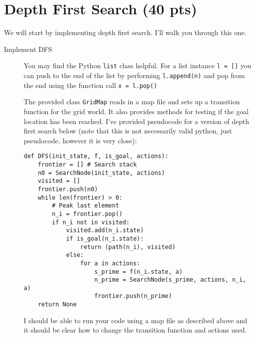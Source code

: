 \documentclass[11pt]{hermans-hw}
\begin{document}
\section{Depth First Search (40 pts)}
We will start by implementing depth first search. I'll walk you through this one.
\begin{description}
\item[Implement DFS] You may find the Python \texttt{list} class helpful. For a list instance \texttt{l = []} you can push to the end of the list by performing \texttt{l.append(n)} and pop from the end using the function call \texttt{x = l.pop()}

The provided class \texttt{GridMap} reads in a map file and sets up a transition function for the grid world. It also provides methods for testing if the goal location has been reached. I've provided pseudocode for a version of depth first search below (note that this is not necessarily valid python, just pseudocode, however it is very close):

\begin{verbatim}
def DFS(init_state, f, is_goal, actions):
    frontier = [] # Search stack
    n0 = SearchNode(init_state, actions)
    visited = []
    frontier.push(n0)
    while len(frontier) > 0:
        # Peak last element
        n_i = frontier.pop()
        if n_i not in visited:
            visited.add(n_i.state)
            if is_goal(n_i.state):
                return (path(n_i), visited)
            else:
                for a in actions:
                    s_prime = f(n_i.state, a)
                    n_prime = SearchNode(s_prime, actions, n_i, a)
                    frontier.push(n_prime)
    return None

\end{verbatim}

I should be able to run your code using a map file as described above and it should be clear how to change the transition function and actions used.


\end{description}
\end{document}
